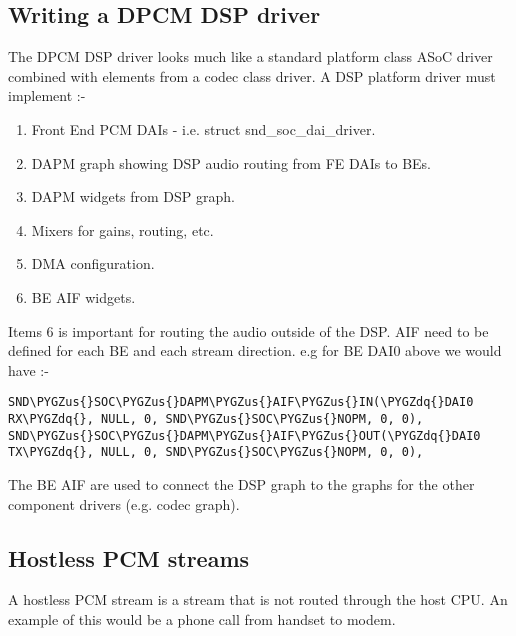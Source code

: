 \documentclass[a4paper,8pt,english]{sphinxmanual}
\def\PYGZus{\char`\_}
\def\PYGZdq{\char`\"}
\begin{document}
\subsection{Writing a DPCM DSP driver}
\label{sound/soc/dpcm:writing-a-dpcm-dsp-driver}
The DPCM DSP driver looks much like a standard platform class ASoC driver
combined with elements from a codec class driver. A DSP platform driver must
implement :-
\begin{enumerate}
\item {} 
Front End PCM DAIs - i.e. struct snd\_soc\_dai\_driver.

\item {} 
DAPM graph showing DSP audio routing from FE DAIs to BEs.

\item {} 
DAPM widgets from DSP graph.

\item {} 
Mixers for gains, routing, etc.

\item {} 
DMA configuration.

\item {} 
BE AIF widgets.

\end{enumerate}

Items 6 is important for routing the audio outside of the DSP. AIF need to be
defined for each BE and each stream direction. e.g for BE DAI0 above we would
have :-

\begin{Verbatim}[commandchars=\\\{\}]
SND\PYGZus{}SOC\PYGZus{}DAPM\PYGZus{}AIF\PYGZus{}IN(\PYGZdq{}DAI0 RX\PYGZdq{}, NULL, 0, SND\PYGZus{}SOC\PYGZus{}NOPM, 0, 0),
SND\PYGZus{}SOC\PYGZus{}DAPM\PYGZus{}AIF\PYGZus{}OUT(\PYGZdq{}DAI0 TX\PYGZdq{}, NULL, 0, SND\PYGZus{}SOC\PYGZus{}NOPM, 0, 0),
\end{Verbatim}

The BE AIF are used to connect the DSP graph to the graphs for the other
component drivers (e.g. codec graph).


\subsection{Hostless PCM streams}
\label{sound/soc/dpcm:hostless-pcm-streams}
A hostless PCM stream is a stream that is not routed through the host CPU. An
example of this would be a phone call from handset to modem.
\end{document}
